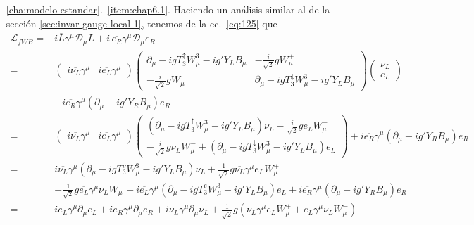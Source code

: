 \begin{itemize}
\item[\ref{cha:modelo-estandar}.~\ref{item:chap6.1}.] 
Haciendo un an\'alisis similar al de la secci\'on \ref{sec:invar-gauge-local-1}, tenemos de la ec.~\eqref{eq:125} que
\begin{align}
\mathcal{L}_{fWB}=&i\overline{L}\gamma^\mu\mathcal{D}_\mu L+i\,\overline{e_R}\gamma^\mu\mathcal{D}_\mu e_R  \nonumber\\
=&\begin{pmatrix} 
  i\overline{\nu_L}\gamma^\mu& i\overline{e_L}\gamma^\mu
\end{pmatrix}\begin{pmatrix}
    \partial_\mu-igT_3^\uparrow W^3_\mu-ig'Y_LB_\mu&-\frac{i}{\sqrt{2}}gW^+_\mu\\
    -\frac{i}{\sqrt{2}}gW^-_\mu&\partial_\mu-igT_3^\downarrow W^3_\mu-ig'Y_LB_\mu
  \end{pmatrix}
  \begin{pmatrix}
    \nu_L\\e_L    
  \end{pmatrix}\nonumber\\
&+i\overline{e_R}\gamma^\mu(\partial_\mu-ig'Y_R B_\mu)e_R\nonumber\\
=&\begin{pmatrix} 
  i\overline{\nu_L}\gamma^\mu& i\overline{e_L}\gamma^\mu
\end{pmatrix} 
  \begin{pmatrix}
    (\partial_\mu-igT_3^\uparrow W^3_\mu-ig'Y_LB_\mu)\nu_L-\frac{i}{\sqrt{2}}ge_LW^+_\mu\\
    -\frac{i}{\sqrt{2}}g\nu_LW^-_\mu+(\partial_\mu-igT_3^\downarrow W^3_\mu-ig'Y_LB_\mu)e_L
  \end{pmatrix}+i\overline{e_R}\gamma^\mu(\partial_\mu-ig'Y_R B_\mu)e_R\nonumber\\
=&i\overline{\nu_L}\gamma^\mu(\partial_\mu-igT_3^\nu W^3_\mu-ig'Y_LB_\mu)\nu_L+\frac{1}{\sqrt{2}}g\overline{\nu_L}\gamma^\mu e_LW^+_\mu\nonumber\\
&+\frac{1}{\sqrt{2}}g\overline{e_L}\gamma^\mu\nu_LW^-_\mu+i\overline{e_L}\gamma^\mu(\partial_\mu-igT_3^eW^3_\mu-ig'Y_LB_\mu)e_L
+i\overline{e_R}\gamma^\mu(\partial_\mu-ig'Y_R B_\mu)e_R\nonumber\\
=&i\overline{e_L}\gamma^\mu\partial_\mu e_L+i\overline{e_R}\gamma^\mu\partial_\mu e_R+i\overline{\nu_L}\gamma^\mu\partial_\mu\nu_L
+\frac{1}{\sqrt{2}}g\left(\overline{\nu_L}\gamma^\mu e_LW^+_\mu+\overline{e_L}\gamma^\mu\nu_LW^-_\mu\right)\nonumber\\

\end{align}
\end{itemize}
